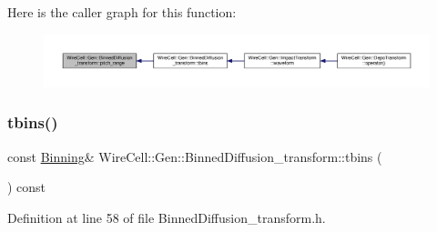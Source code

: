 Here is the caller graph for this function\+:
\nopagebreak
\begin{figure}[H]
\begin{center}
\leavevmode
\includegraphics[width=350pt]{class_wire_cell_1_1_gen_1_1_binned_diffusion__transform_a930b6511084f18a355737ca78cbc5bb8_icgraph}
\end{center}
\end{figure}
\mbox{\label{class_wire_cell_1_1_gen_1_1_binned_diffusion__transform_a57f26ea414abfae84cf54bdbe7992db5}} 
\subsubsection{\texorpdfstring{tbins()}{tbins()}}
{\footnotesize\ttfamily const \hyperlink{class_wire_cell_1_1_binning}{Binning}\& Wire\+Cell\+::\+Gen\+::\+Binned\+Diffusion\+\_\+transform\+::tbins (\begin{DoxyParamCaption}{ }\end{DoxyParamCaption}) const\hspace{0.3cm}{\ttfamily [inline]}}



Definition at line 58 of file Binned\+Diffusion\+\_\+transform.\+h.

